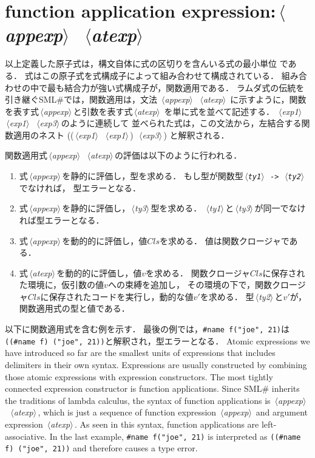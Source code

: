\documentclass{jbook}
\newcommand{\txt}[2]{#2}
\newcommand{\smlsharp}{SML\#}
\newcommand{\code}[1]{\mbox{\large\tt #1}}
\newcommand{\nonterm}[1]{\mbox{$\,\langle$}{\it #1}\mbox{$\rangle\,$}}
\begin{document}
\section{\txt{関数適応式}{function application expression}:\nonterm{appexp}\ \nonterm{atexp}}

\ifjp%
	以上定義した原子式は，構文自体に式の区切りを含んいる式の最小単位
である．
	式はこの原子式を式構成子によって組み合わせて構成されている．
	組み合わせの中で最も結合力が強い式構成子が，関数適用である．
	ラムダ式の伝統を引き継ぐ\smlsharp{}では，関数適用は，文法
\nonterm{appexp}\ \nonterm{atexp}
に示すように，関数を表す式\nonterm{appexp}と引数を表す式\nonterm{atexp}
を単に式を並べて記述する．
	\nonterm{exp1}\ \nonterm{exp1}\ \nonterm{exp3}のように連続して
並べられた式は，この文法から，左結合する関数適用のネスト
((\nonterm{exp1}\ \nonterm{exp1})\ \nonterm{exp3})
と解釈される．

	関数適用式\nonterm{appexp}\ \nonterm{atexp}の評価は以下のように行われる．
\begin{enumerate}
\item 式\nonterm{appexp}を静的に評価し，型を求める．
	もし型が関数型\code{\nonterm{ty1} -> \nonterm{ty2}}でなければ，
型エラーとなる．
\item 式\nonterm{appexp}を静的に評価し，\nonterm{ty3}型を求める．
	\nonterm{ty1}と\nonterm{ty3}が同一でなければ型エラーとなる．
\item 式\nonterm{appexp}を動的的に評価し，値$Cls$を求める．
	値は関数クロージャである．
\item 式\nonterm{atexp}を動的的に評価し，値$v$を求める．
	関数クロージャ$Cls$に保存された環境に，仮引数の値$v$への束縛を追加し，
その環境の下で，関数クロージャ$Cls$に保存されたコードを実行し，動的な値$v'$を求める．
	型\nonterm{ty2}と$v'$が，関数適用式の型と値である．
\end{enumerate}

	以下に関数適用式を含む例を示す．
	最後の例では，\code{\#name f("joe", 21)}は
\code{((\#name f) ("joe", 21))}と解釈され，型エラーとなる．
\else%
	Atomic expressions we have introduced so far are the
smallest units of expressions that includes delimiters in their
own syntax.
	Expressions are usually constructed by combining those
atomic expressions with expression constructors.
	The most tightly connected expression constructor is
function applications.
	Since \smlsharp{} inherits the traditions of lambda calculus,
the syntax of function applications is
\nonterm{appexp}\ \nonterm{atexp},
which is just a sequence of
function expression \nonterm{appexp} and
argument expression \nonterm{atexp}.
	As seen in this syntax, function applications are
left-associative.
	In the last example,
\code{\#name f("joe", 21)} is interpreted as
\code{((\#name f) ("joe", 21))} and therefore causes a type error.
\fi%
	
\end{document}
